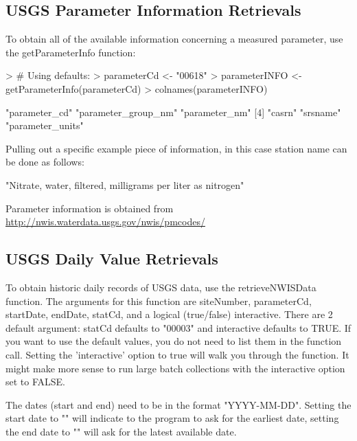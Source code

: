 \documentclass[a4paper,11pt]{article}
\begin{document}
\subsection{USGS Parameter Information Retrievals}
To obtain all of the available information concerning a measured parameter, use the getParameterInfo function:
\begin{Schunk}
\begin{Sinput}
> # Using defaults:
> parameterCd <- "00618" 
> parameterINFO <- getParameterInfo(parameterCd)
> colnames(parameterINFO)
\end{Sinput}
\begin{Soutput}
[1] "parameter_cd"       "parameter_group_nm" "parameter_nm"      
[4] "casrn"              "srsname"            "parameter_units"   
\end{Soutput}
\end{Schunk}

Pulling out a specific example piece of information, in this case station name can be done as follows:
\begin{Schunk}
\begin{Soutput}
[1] "Nitrate, water, filtered, milligrams per liter as nitrogen"
\end{Soutput}
\end{Schunk}
Parameter information is obtained from \url{http://nwis.waterdata.usgs.gov/nwis/pmcodes/}

\subsection{USGS Daily Value Retrievals}
To obtain historic daily records of USGS data, use the retrieveNWISData function. The arguments for this function are siteNumber, parameterCd, startDate, endDate, statCd, and a logical (true/false) interactive. There are 2 default argument: statCd defaults to "00003" and interactive defaults to TRUE.  If you want to use the default values, you do not need to list them in the function call. Setting the 'interactive' option to true will walk you through the function. It might make more sense to run large batch collections with the interactive option set to FALSE. 

The dates (start and end) need to be in the format "YYYY-MM-DD".  Setting the start date to "" will indicate to the program to ask for the earliest date, setting the end date to "" will ask for the latest available date.
\end{document}

